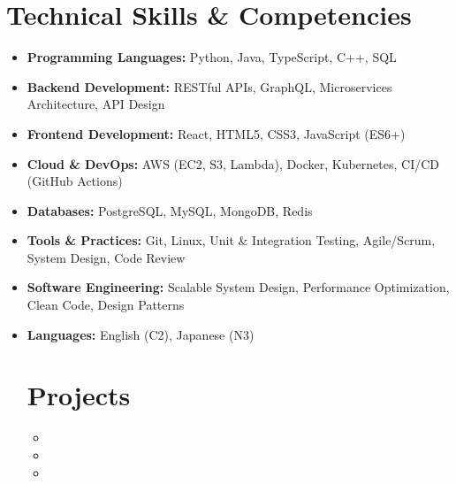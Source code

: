 \documentclass[11pt,a4paper,sans]{moderncv}
\newcommand{\projectone}{\cloudscale}
\newcommand{\projecttwo}{\devtrack}
\newcommand{\projectthree}{\datastream}
\begin{document}
\makecvtitle

\vspace{-0.0cm}



\section{Technical Skills \& Competencies}
\begin{itemize}

\item \textbf{Programming Languages:} Python, Java, TypeScript, C++, SQL

\item \textbf{Backend Development:} RESTful APIs, GraphQL, Microservices Architecture, API Design

\item \textbf{Frontend Development:} React, HTML5, CSS3, JavaScript (ES6+)

\item \textbf{Cloud \& DevOps:} AWS (EC2, S3, Lambda), Docker, Kubernetes, CI/CD (GitHub Actions)

\item \textbf{Databases:} PostgreSQL, MySQL, MongoDB, Redis

\item \textbf{Tools \& Practices:} Git, Linux, Unit \& Integration Testing, Agile/Scrum, System Design, Code Review

\item \textbf{Software Engineering:} Scalable System Design, Performance Optimization, Clean Code, Design Patterns

\item \textbf{Languages:} English (C2), Japanese (N3)


\section{Projects}
\begin{itemize}
\item \projectone
\item \projecttwo
\item \projectthree
\end{itemize}

\end{itemize}

\vspace{0.2cm}
\end{document}

